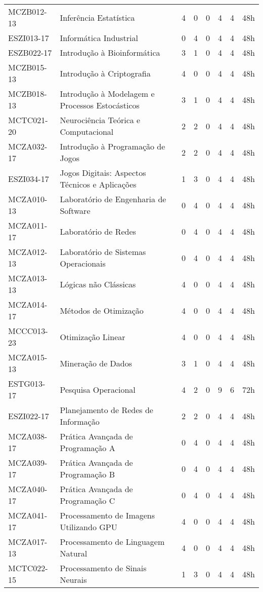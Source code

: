 \documentclass[a4paper]{article}
\begin{document}
\begin{longtable}{|l|l|llll|l|l|}
MCZB012-13 & Inferência Estatística & 4 & 0 & 0 & 4 & 4 & 48h \\
ESZI013-17 & Informática Industrial & 0 & 4 & 0 & 4 & 4 & 48h \\
ESZB022-17 & Introdução à Bioinformática & 3 & 1 & 0 & 4 & 4 & 48h \\
MCZB015-13 & Introdução à Criptografia & 4 & 0 & 0 & 4 & 4 & 48h \\
MCZB018-13 & Introdução à Modelagem e Processos Estocásticos & 3 & 1 & 0 & 4 & 4 & 48h \\
MCTC021-20 & Neurociência Teórica e Computacional & 2 & 2 & 0 & 4 & 4 & 48h \\
MCZA032-17 & Introdução à Programação de Jogos & 2 & 2 & 0 & 4 & 4 & 48h \\
ESZI034-17 & Jogos Digitais: Aspectos Técnicos e Aplicações & 1 & 3 & 0 & 4 & 4 & 48h \\
MCZA010-13 & Laboratório de Engenharia de Software & 0 & 4 & 0 & 4 & 4 & 48h \\
MCZA011-17 & Laboratório de Redes & 0 & 4 & 0 & 4 & 4 & 48h \\
MCZA012-13 & Laboratório de Sistemas Operacionais & 0 & 4 & 0 & 4 & 4 & 48h \\
MCZA013-13 & Lógicas não Clássicas & 4 & 0 & 0 & 4 & 4 & 48h \\
MCZA014-17 & Métodos de Otimização & 4 & 0 & 0 & 4 & 4 & 48h \\
MCCC013-23 & Otimização Linear & 4 & 0 & 0 & 4 & 4 & 48h \\ %
MCZA015-13 & Mineração de Dados & 3 & 1 & 0 & 4 & 4 & 48h \\
ESTG013-17 & Pesquisa Operacional & 4 & 2 & 0 & 9 & 6 & 72h \\
ESZI022-17 & Planejamento de Redes de Informação & 2 & 2 & 0 & 4 & 4 & 48h \\
MCZA038-17 & Prática Avançada de Programação A & 0 & 4 & 0 & 4 & 4 & 48h \\
MCZA039-17 & Prática Avançada de Programação B & 0 & 4 & 0 & 4 & 4 & 48h \\
MCZA040-17 & Prática Avançada de Programação C & 0 & 4 & 0 & 4 & 4 & 48h \\
MCZA041-17 & Processamento de Imagens Utilizando GPU & 4 & 0 & 0 & 4 & 4 & 48h \\
MCZA017-13 & Processamento de Linguagem Natural & 4 & 0 & 0 & 4 & 4 & 48h \\
MCTC022-15 & Processamento de Sinais Neurais & 1 & 3 & 0 & 4 & 4 & 48h \\

\end{longtable}
\end{document}
